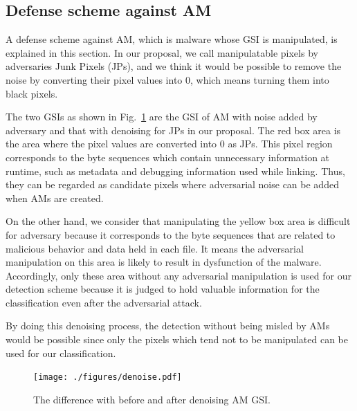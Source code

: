 \documentclass{ieeeaccess}
\newcommand{\myfigurename}{Fig.}
\begin{document}
\subsection{Defense scheme against AM}
A defense scheme against AM, which is malware whose GSI is manipulated, is explained in this section.
In our proposal, we call manipulatable pixels by adversaries Junk Pixels (JPs), and we think it would be possible to remove the noise by converting their pixel values into 0, which means turning them into black pixels.

The two GSIs as shown in \myfigurename~\ref{fig:denoise} are the GSI of AM with noise added by adversary and that with denoising for JPs in our proposal.
The red box area is the area where the pixel values are converted into 0 as JPs.
This pixel region corresponds to the byte sequences which contain unnecessary information at runtime, such as metadata and debugging information used while linking.
Thus, they can be regarded as candidate pixels where adversarial noise can be added when AMs are created.

On the other hand, we consider that manipulating the yellow box area is difficult for adversary because it corresponds to the byte sequences that are related to malicious behavior and data held in each file.
It means the adversarial manipulation on this area is likely to result in dysfunction of the malware.
Accordingly, only these area without any adversarial manipulation is used for our detection scheme because it is judged to hold valuable information for the classification even after the adversarial attack.

By doing this denoising process, the detection without being misled by AMs would be possible since only the pixels which tend not to be manipulated can be used for our classification.

\begin{figure}[t]
 \centering
 \texttt{[image: ./figures/denoise.pdf]}
 \caption{The difference with before and after denoising AM GSI.} 
 \label{fig:denoise}
\end{figure}
\end{document}
